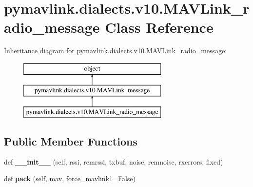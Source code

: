 \hypertarget{classpymavlink_1_1dialects_1_1v10_1_1MAVLink__radio__message}{}\section{pymavlink.\+dialects.\+v10.\+M\+A\+V\+Link\+\_\+radio\+\_\+message Class Reference}
\label{classpymavlink_1_1dialects_1_1v10_1_1MAVLink__radio__message}
Inheritance diagram for pymavlink.\+dialects.\+v10.\+M\+A\+V\+Link\+\_\+radio\+\_\+message\+:\begin{figure}[H]
\begin{center}
\leavevmode
\includegraphics[height=3.000000cm]{classpymavlink_1_1dialects_1_1v10_1_1MAVLink__radio__message}
\end{center}
\end{figure}
\subsection*{Public Member Functions}
\begin{DoxyCompactItemize}
\item 
\mbox{\label{classpymavlink_1_1dialects_1_1v10_1_1MAVLink__radio__message_a6057cf5d80f00965f0be871bc79808c4}} 
def {\bfseries \+\_\+\+\_\+init\+\_\+\+\_\+} (self, rssi, remrssi, txbuf, noise, remnoise, rxerrors, fixed)
\item 
\mbox{\label{classpymavlink_1_1dialects_1_1v10_1_1MAVLink__radio__message_ad10d2cdcc1426687db1c790a59d93eb0}} 
def {\bfseries pack} (self, mav, force\+\_\+mavlink1=False)
\end{DoxyCompactItemize}
